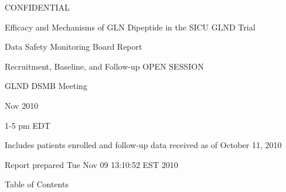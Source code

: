 \documentclass[dvips,10pt]{article}
\begin{document}
\vspace*{1in}
\begin{center}
{\Huge{CONFIDENTIAL}}
\end{center}
\vspace*{0.5in}
\begin{center}
{\Huge{Efficacy and Mechanisms of GLN Dipeptide in the SICU GLND Trial}}
\end{center}
\vspace*{0.5in}
\begin{center}
{\Huge{Data Safety Monitoring Board Report}}
\end{center}
\vspace*{0.25in}
\begin{center}
{\Huge{
Recruitment, Baseline, and Follow-up  OPEN SESSION
}}
\end{center}
\vspace*{1in}
\begin{center}
{\Huge{GLND DSMB Meeting}}
\end{center}
\begin{center}
{\Huge{
 Nov 2010
}}
\end{center}
\begin{center}
{\Huge{1-5 pm EDT}}
\end{center}
\vspace*{1in}
\begin{center}
\noindent
{\Large{Includes patients enrolled and follow-up data received as of October 11, 2010}}
\end{center}
\vspace*{0.5in}
\begin{center}
{\Large{Report prepared  Tue Nov 09 13:10:52 EST 2010 }}
\end{center}
\clearpage
\vspace*{1in}
\begin{center}
{\Huge{Table of Contents}}
\end{center}
\listoftables
\listoffigures
\clearpage
\end{document}
